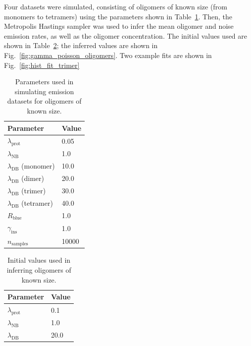Four datasets were simulated, consisting of oligomers of known size (from monomers to tetramers) using the parameters shown in Table~\ref{tab:oligomer_params}. Then, the Metropolis Hastings sampler was used to infer the mean oligomer and noise emission rates, as well as the oligomer concentration. The initial values used are shown in Table~\ref{tab:initial_values}; the inferred values are shown in Fig.~\ref{fig:gamma_poisson_oligomers}. Two example fits are shown in Fig.~\ref{fig:hist_fit_trimer}

\begin{center}
\begin{table}[!ht]
\caption{Parameters used in simulating emission datasets for oligomers of known size.}
\begin{tabular}{|l|l|}
\hline
{\bf Parameter} & {\bf Value}\\ \hline
$\lambda_{\text{prot}}$ & 0.05\\
$\lambda_{\text{NB}}$ & 1.0\\
$\lambda_{\text{DB}}$ (monomer) & 10.0\\
$\lambda_{\text{DB}}$ (dimer) & 20.0\\
$\lambda_{\text{DB}}$ (trimer) & 30.0\\
$\lambda_{\text{DB}}$ (tetramer) & 40.0\\
$R_{\text{blue}}$ & 1.0\\
$\gamma_{\text{ins}}$ & 1.0\\
$n_{\text{samples}}$ & 10000\\ \hline
\end{tabular}
\label{tab:oligomer_params}
\end{table}
\end{center}

\begin{center}
\begin{table}[!ht]
\caption{Initial values used in inferring  oligomers of known size.}
\begin{tabular}{|l|l|}
\hline
{\bf Parameter} & {\bf Value}\\ \hline
$\lambda_{\text{prot}}$ & 0.1\\
$\lambda_{\text{NB}}$ & 1.0\\
$\lambda_{\text{DB}}$ & 20.0\\
\hline
\end{tabular}
\label{tab:initial_values}
\end{table}
\end{center}

